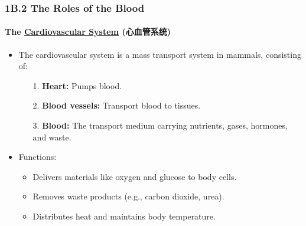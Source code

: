 
\subsubsection{1B.2 The Roles of the Blood}
\paragraph{The \underline{Cardiovascular System} (心血管系统)}
\begin{itemize}
    \item The cardiovascular system is a mass transport system in mammals, consisting of:
    \begin{itemize}
        \item[1.] \textbf{Heart:} Pumps blood.
        \item[2.] \textbf{Blood vessels:} Transport blood to tissues.
        \item[3.] \textbf{Blood:} The transport medium carrying nutrients, gases, hormones, and waste.
    \end{itemize}
    \item Functions:
    \begin{itemize}
        \item Delivers materials like oxygen and glucose to body cells.
        \item Removes waste products (e.g., carbon dioxide, urea).
        \item Distributes heat and maintains body temperature.
    \end{itemize}
\end{itemize}

